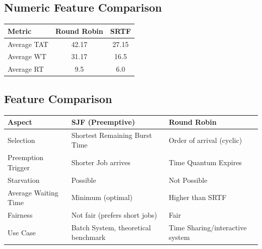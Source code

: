 \documentclass[12pt, a4paper]{article}
\begin{document}
\subsection*{Numeric Feature Comparison}
\begin{table}[H]
    \centering
    \renewcommand{\arraystretch}{1.3}
    \begin{tabular}{|l|c|c|}
        \hline
        \textbf{Metric} & \textbf{Round Robin} & \textbf{SRTF} \\
        \hline
        Average TAT & 42.17 & 27.15 \\
        Average WT & 31.17 & 16.5 \\
        Average RT & 9.5 & 6.0 \\
        \hline
    \end{tabular}
\end{table}

\subsection*{Feature Comparison}
\begin{table}[H]
    \centering
    \renewcommand{\arraystretch}{1.3}
    \begin{tabular}{|l|l|l|}
        \hline
        \textbf{Aspect} & \textbf{SJF (Preemptive)} & \textbf{Round Robin} \\
        \hline
        Selection & Shortest Remaining Burst Time & Order of arrival (cyclic) \\
        Preemption Trigger & Shorter Job arrives & Time Quantum Expires \\
        Starvation & Possible & Not Possible \\
        Average Waiting Time & Minimum (optimal) & Higher than SRTF \\
        Fairness & Not fair (prefers short jobs) & Fair \\
        Use Case & Batch System, theoretical benchmark & Time Sharing/interactive system \\
        \hline
    \end{tabular}
\end{table}
\end{document}
